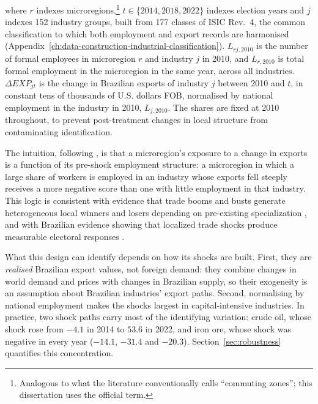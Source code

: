 \documentclass[
	11pt,				%
	oneside,			%
	a4paper,			%
	english,			%
	english				%
	]{abntex2ppgsi}
\theoremstyle{plain}
\theoremstyle{remark}
\theoremstyle{plain}%
\theoremstyle{remark}%
\begin{document}
\noindent where \( r \) indexes microregions,\footnote{Analogous to what the literature conventionally calls ``commuting zones''; this dissertation uses the official term.} \( t \in \{2014, 2018, 2022\} \) indexes election years and \( j \) indexes 152 industry groups, built from 177 classes of ISIC Rev.~4, the common classification to which both employment and export records are harmonised (Appendix~\ref{ch:data-construction-industrial-classification}). \( L_{rj,2010} \) is the number of formal employees in microregion \( r \) and industry \( j \) in 2010, and \( L_{r,2010} \) is total formal employment in the microregion in the same year, across all industries. \( \Delta EXP_{jt} \) is the change in Brazilian exports of industry \( j \) between 2010 and \( t \), in constant tens of thousands of U.S. dollars FOB, normalised by national employment in the industry in 2010, \( L_{j,2010} \). The shares are fixed at 2010 throughout, to prevent post-treatment changes in local structure from contaminating identification.

The intuition, following , is that a microregion's exposure to a change in exports is a function of its pre-shock employment structure: a microregion in which a large share of workers is employed in an industry whose exports fell steeply receives a more negative score than one with little employment in that industry. This logic is consistent with evidence that trade booms and busts generate heterogeneous local winners and losers depending on pre-existing specialization \cite{costa2012}, and with Brazilian evidence showing that localized trade shocks produce measurable electoral responses \cite{campellourdinez2021}.

What this design can identify depends on how its shocks are built. First, they are \emph{realised} Brazilian export values, not foreign demand: they combine changes in world demand and prices with changes in Brazilian supply, so their exogeneity is an assumption about Brazilian industries' export paths. Second, normalising by national employment makes the shocks largest in capital-intensive industries. In practice, two shock paths carry most of the identifying variation: crude oil, whose shock rose from $-4.1$ in 2014 to $53.6$ in 2022, and iron ore, whose shock was negative in every year ($-14.1$, $-31.4$ and $-20.3$). Section~\ref{sec:robustness} quantifies this concentration.
\end{document}
